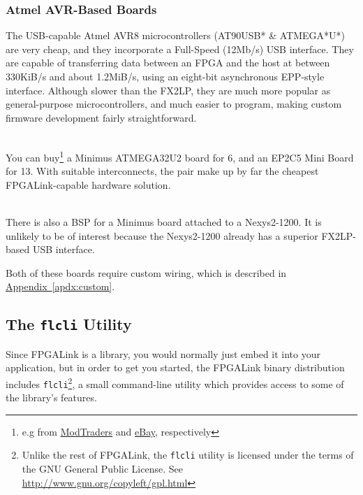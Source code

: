 \subsubsection{Atmel AVR-Based Boards}

The USB-capable Atmel AVR8 microcontrollers (AT90USB* \& ATMEGA*U*) are very cheap, and they incorporate a Full-Speed (12Mb/s) USB interface. They are capable of transferring data between an FPGA and the host at between 330KiB/s and about 1.2MiB/s, using an eight-bit asynchronous EPP-style interface. Although slower than the FX2LP, they are much more popular as general-purpose microcontrollers, and much easier to program, making custom firmware development fairly straightforward.

\begin{desc}
  \item[\sffamily{Minimus/EP2C5 Board:}] \hfill \\
    You can buy\footnote{e.g from \href{http://www.modtraders.co.uk/minimus-32-avr-usb-development-board.html}{ModTraders} and \href{www.ebay.co.uk/itm/150835820710}{eBay}, respectively} a Minimus ATMEGA32U2 board for \textsterling{}6, and an EP2C5 Mini Board for \textsterling{}13. With suitable interconnects, the pair make up by far the cheapest FPGALink-capable hardware solution.
  \item[\sffamily{Minimus/Nexys2 Board:}] \hfill \\
    There is also a BSP for a Minimus board attached to a Nexys2-1200. It is unlikely to be of interest because the Nexys2-1200 already has a superior FX2LP-based USB interface.
\end{desc}

Both of these boards require custom wiring, which is described in \hyperref[apdx:custom]{Appendix~\ref*{apdx:custom}}.

\newpage
\subsection{The \texttt{flcli} Utility}
Since FPGALink is a library, you would normally just embed it into your application, but in order to get you started, the FPGALink binary distribution includes \texttt{flcli}\footnote{Unlike the rest of FPGALink, the \texttt{flcli} utility is licensed under the terms of the GNU General Public License. See \url{http://www.gnu.org/copyleft/gpl.html}}, a small command-line utility which provides access to some of the library's features.


